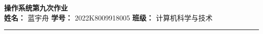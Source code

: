 \newcommand{\Homework}{操作系统第九次作业}
\newcommand{\Name}{蓝宇舟}
\newcommand{\StudentNumber}{2022K8009918005}
\newcommand{\Class}{计算机科学与技术}

\begingroup
    \centering
    \LARGE {\bf \Homework} \\[0.5em]
    \large \textbf{姓名：} \Name \hspace{2em}
           \textbf{学号：} \StudentNumber \hspace{2em}
           \textbf{班级：} \Class \par
\endgroup
\rule{\textwidth}{0.4pt}
\printanswers
